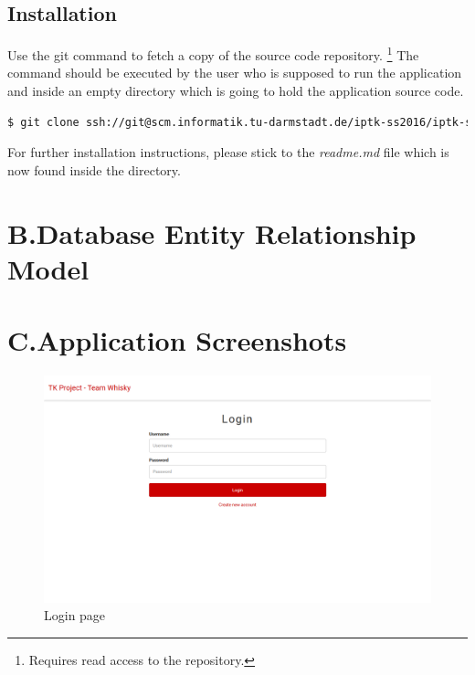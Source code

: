 \documentclass[nochapterpage,nopartpage,noheadingspace,numbersubsubsec,bigchapter,colorback,accentcolor=tud9c,10pt]{tudreport}
\begin{document}
  \section*{Installation}
  \label{sec:appendix:setup:install}

    \noindent Use the git command to fetch a copy of the source code repository.%
    \footnote{Requires read access to the repository.}
    The command should be executed by the user who is supposed to run the application and inside an empty directory which is going to hold the application source code.
        \begin{lstlisting}[language=bash]
    $ git clone ssh://git@scm.informatik.tu-darmstadt.de/iptk-ss2016/iptk-ss2016-team-whiskey.git .
        \end{lstlisting}
    For further installation instructions, please stick to the \emph{readme.md} file which is now found inside the directory.

  \chapter*{B.\quad Database Entity Relationship Model}

  \chapter*{C.\quad Application Screenshots}

        \begin{figure}[!ht]
            \centering
            \includegraphics[width=\textwidth]{img/ui-login}
            \caption{Login page}
            \label{fig:appendix:screenshots:ui-login}
        \end{figure}
\end{document}
